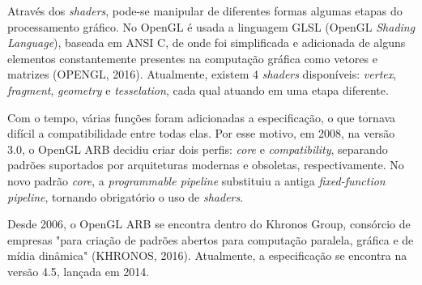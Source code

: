 Através dos \textit{shaders}, pode-se manipular de diferentes formas algumas etapas do processamento gráfico. No OpenGL é usada a linguagem GLSL (OpenGL \textit{Shading Language}), baseada em ANSI C, de onde foi simplificada e adicionada de alguns elementos constantemente presentes na computação gráfica como vetores e matrizes (OPENGL, 2016). Atualmente, existem 4 \textit{shaders} disponíveis: \textit{vertex}, \textit{fragment}, \textit{geometry} e \textit{tesselation}, cada qual atuando em uma etapa diferente.

Com o tempo, várias funções foram adicionadas a especificação, o que tornava difícil a compatibilidade entre todas elas. Por esse motivo, em 2008, na versão 3.0, o OpenGL ARB decidiu criar dois perfis: \textit{core} e \textit{compatibility}, separando padrões suportados por arquiteturas modernas e obsoletas, respectivamente. No novo padrão \textit{core}, a \textit{programmable pipeline} substituiu a antiga \textit{fixed-function pipeline}, tornando obrigatório o uso de \textit{shaders}.

Desde 2006, o OpenGL ARB se encontra dentro do Khronos Group, consórcio de empresas "para criação de padrões abertos para computação paralela, gráfica e de mídia dinâmica" (KHRONOS, 2016). Atualmente, a especificação se encontra na versão 4.5, lançada em 2014.